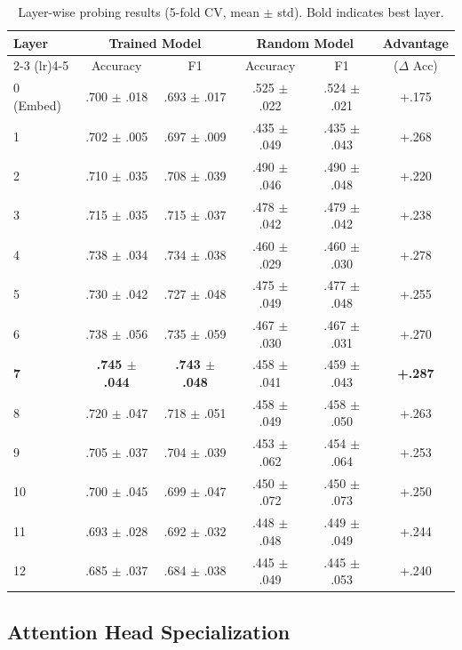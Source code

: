 \documentclass{article}
\begin{document}
\begin{table}[t]
    \centering
    \caption{Layer-wise probing results (5-fold CV, mean $\pm$ std). Bold indicates best layer.}
    \label{tab:layerwise}
    \begin{tabular}{lccccc}
        \toprule
        Layer & \multicolumn{2}{c}{Trained Model} & \multicolumn{2}{c}{Random Model} & Advantage \\
        \cmidrule(lr){2-3} \cmidrule(lr){4-5}
         & Accuracy & F1 & Accuracy & F1 & ($\Delta$ Acc) \\
        \midrule
        0 (Embed) & .700 $\pm$ .018 & .693 $\pm$ .017 & .525 $\pm$ .022 & .524 $\pm$ .021 & +.175 \\
        1 & .702 $\pm$ .005 & .697 $\pm$ .009 & .435 $\pm$ .049 & .435 $\pm$ .043 & +.268 \\
        2 & .710 $\pm$ .035 & .708 $\pm$ .039 & .490 $\pm$ .046 & .490 $\pm$ .048 & +.220 \\
        3 & .715 $\pm$ .035 & .715 $\pm$ .037 & .478 $\pm$ .042 & .479 $\pm$ .042 & +.238 \\
        4 & .738 $\pm$ .034 & .734 $\pm$ .038 & .460 $\pm$ .029 & .460 $\pm$ .030 & +.278 \\
        5 & .730 $\pm$ .042 & .727 $\pm$ .048 & .475 $\pm$ .049 & .477 $\pm$ .048 & +.255 \\
        6 & .738 $\pm$ .056 & .735 $\pm$ .059 & .467 $\pm$ .030 & .467 $\pm$ .031 & +.270 \\
        \textbf{7} & \textbf{.745 $\pm$ .044} & \textbf{.743 $\pm$ .048} & .458 $\pm$ .041 & .459 $\pm$ .043 & \textbf{+.287} \\
        8 & .720 $\pm$ .047 & .718 $\pm$ .051 & .458 $\pm$ .049 & .458 $\pm$ .050 & +.263 \\
        9 & .705 $\pm$ .037 & .704 $\pm$ .039 & .453 $\pm$ .062 & .454 $\pm$ .064 & +.253 \\
        10 & .700 $\pm$ .045 & .699 $\pm$ .047 & .450 $\pm$ .072 & .450 $\pm$ .073 & +.250 \\
        11 & .693 $\pm$ .028 & .692 $\pm$ .032 & .448 $\pm$ .048 & .449 $\pm$ .049 & +.244 \\
        12 & .685 $\pm$ .037 & .684 $\pm$ .038 & .445 $\pm$ .049 & .445 $\pm$ .053 & +.240 \\
        \bottomrule
    \end{tabular}
\end{table}

\subsection{Attention Head Specialization}
\end{document}
